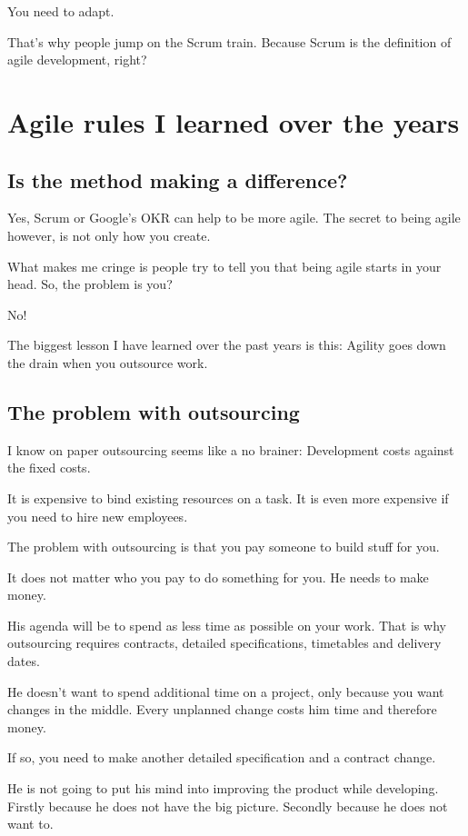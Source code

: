 \documentclass[12pt, numbers=noenddot]{scrreprt} %
\begin{document}
You need to adapt.

That’s why people jump on the Scrum train. Because Scrum is the definition of agile development, right?

\section{Agile rules I learned over the years}

\subsection{Is the method making a difference?}
Yes, Scrum or Google’s OKR can help to be more agile. The secret to being agile however, is not only how you create.

What makes me cringe is people try to tell you that being agile starts in your head. So, the problem is you?

No!

The biggest lesson I have learned over the past years is this: Agility goes down the drain when you outsource work.

\subsection{The problem with outsourcing}
I know on paper outsourcing seems like a no brainer: Development costs against the fixed costs.

It is expensive to bind existing resources on a task. It is even more expensive if you need to hire new employees.

The problem with outsourcing is that you pay someone to build stuff for you.

It does not matter who you pay to do something for you. He needs to make money.

His agenda will be to spend as less time as possible on your work. That is why outsourcing requires contracts, detailed specifications, timetables and delivery dates.

He doesn’t want to spend additional time on a project, only because you want changes in the middle. Every unplanned change costs him time and therefore money.

If so, you need to make another detailed specification and a contract change.

He is not going to put his mind into improving the product while developing. Firstly because he does not have the big picture. Secondly because he does not want to.
\end{document}
